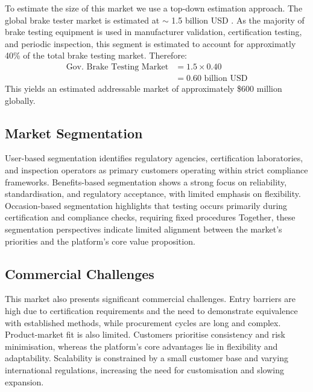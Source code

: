 \documentclass[11pt, a4paper]{report}
\numberwithin{equation}{section}
\begin{document}
\begin{refsection}
To estimate the size of this market we use a top-down estimation approach. The global brake tester market is estimated at $\sim$ 1.5 billion USD {\cite{promarketreports_brake_tester}}. As the majority of brake testing equipment is used in manufacturer validation, certification testing, and periodic inspection, this segment is estimated to account for approximatly 40\% of the total brake testing market. Therefore:
\begin{equation}
\begin{aligned}
\text{Gov. Brake Testing Market} &= 1.5 \times 0.40 \\
&= 0.60 \text{ billion USD}
\end{aligned}
\end{equation}
\vspace{+6pt}
This yields an estimated addressable market of approximately \$600 million globally.
\vspace{-10pt}
\subsection{Market Segmentation}
\label{sec:ch6-gov-market-segmentation}
User-based segmentation identifies regulatory agencies, certification laboratories, and inspection operators as primary customers operating within strict compliance frameworks. Benefits-based segmentation shows a strong focus on reliability, standardisation, and regulatory acceptance, with limited emphasis on flexibility. Occasion-based segmentation highlights that testing occurs primarily during certification and compliance checks, requiring fixed procedures
Together, these segmentation perspectives indicate limited alignment between the market’s priorities and the platform’s core value proposition.

\subsection{Commercial Challenges}
\label{sec:commercial_challenges}
\label{sec:ch6-gov-commercial-challenges}
This market also presents significant commercial challenges. Entry barriers are high due to certification requirements and the need to demonstrate equivalence with established methods, while procurement cycles are long and complex.
Product-market fit is also limited. Customers prioritise consistency and risk minimisation, whereas the platform’s core advantages lie in flexibility and adaptability.
Scalability is constrained by a small customer base and varying international regulations, increasing the need for customisation and slowing expansion.


\end{refsection}
\end{document}
